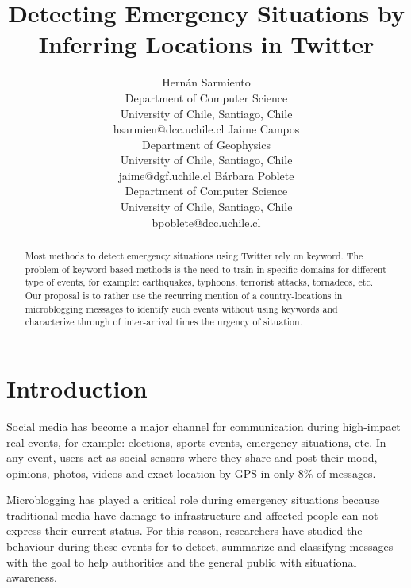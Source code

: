\documentclass[letterpaper]{article} %
\begin{document}
%
\title{Detecting Emergency Situations by Inferring Locations in Twitter}
\author{Hern\'an Sarmiento\\ Department of Computer Science \\ University of Chile, Santiago, Chile \\ hsarmien@dcc.uchile.cl
	\And Jaime Campos \\ Department of Geophysics \\ University of Chile, Santiago, Chile \\ jaime@dgf.uchile.cl
	\And B\'arbara Poblete\\ Department of Computer Science \\ University of Chile, Santiago, Chile \\ bpoblete@dcc.uchile.cl
}

\maketitle
\begin{abstract}
Most methods to detect emergency situations using Twitter rely on keyword. The problem of keyword-based methods is the need to train in specific domains for different type of events, for example: earthquakes, typhoons, terrorist attacks, tornadeos, etc.
Our proposal is to rather use the recurring mention of a country-locations in microblogging messages to identify such events without using keywords and characterize through of inter-arrival times the urgency of situation.
\end{abstract}

\noindent
\section{Introduction}

Social media has become a major channel for communication during high-impact real events, for example: elections, sports events, emergency situations, etc. In any event, users act as social sensors where they share and post their mood, opinions, photos, videos and exact location by GPS in only $8\%$ of messages.

Microblogging has played a critical role during emergency situations because traditional media have damage to infrastructure and affected people can not express their current status. For this reason, researchers have studied the behaviour during these events for to detect, summarize and classifyng messages with the goal to help authorities and the general public with situational awareness.
\end{document}
